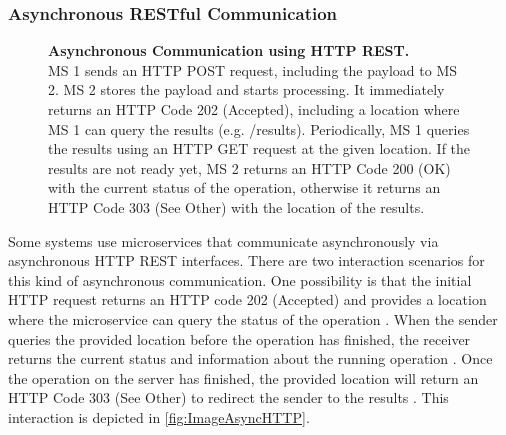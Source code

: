 \subsubsection{Asynchronous RESTful Communication}
\label{sec:Foundation:AsyncCommunication:REST}
\begin{figure}
\centering
\caption{\textbf{Asynchronous Communication using HTTP REST.} \\
MS 1 sends an HTTP POST request, including the payload to MS 2. MS 2 stores the payload and starts processing. It immediately returns an HTTP Code 202 (Accepted), including a location where MS 1 can query the results (e.g. /results). Periodically, MS 1 queries the results using an HTTP GET request at the given location. If the results are not ready yet, MS 2 returns an HTTP Code 200 (OK) with the current status of the operation, otherwise it returns an HTTP Code 303 (See Other) with the location of the results.}
\label{fig:ImageAsyncHTTP}
\end{figure}

Some systems use microservices that communicate asynchronously via asynchronous HTTP REST interfaces.
There are two interaction scenarios for this kind of asynchronous communication.
One possibility is that the initial HTTP request returns an HTTP code 202 (Accepted) and provides a location where the microservice can query the status of the operation \cite{Mayer2018}.
When the sender queries the provided location before the operation has finished, the receiver returns the current status and information about the running operation \cite{Mayer2018}.
Once the operation on the server has finished, the provided location will return an HTTP Code 303 (See Other) to redirect the sender to the results \cite{Mayer2018}.
This interaction is depicted in \autoref{fig:ImageAsyncHTTP}.

